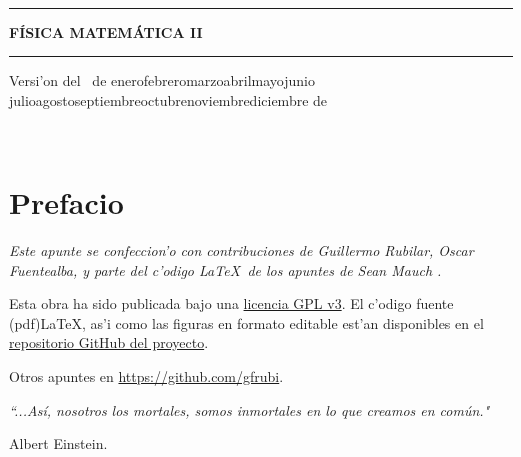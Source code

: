 \documentclass[letterpaper,11pt]{report}
\def\today{\number\day~de\space\ifcase\month\or
 enero\or febrero\or marzo\or abril\or mayo\or junio\or
 julio\or agosto\or septiembre\or octubre\or noviembre\or diciembre\fi
 \space de~\number\year}
\begin{document}
\thispagestyle{empty}
\begin{center}

\ 

\vspace{6.5cm}

\rule{15cm}{0.1cm}

\vspace{1.5cm}

{\huge \textsc{\textbf{F\'ISICA MATEM\'ATICA II}}}

\vspace{1.5cm}

\rule{15cm}{0.1cm}

\vspace{1.5cm}

Versi'on del \today

\end{center}


\newpage
\thispagestyle{empty}
\ \\
\newpage
\setcounter{page}{1}

\pagestyle{plain}
\chapter*{Prefacio}
\bigskip
\bigskip
\bigskip
\bigskip
\bigskip
\bigskip



\bigskip\emph{Este apunte se confeccion'o con contribuciones de Guillermo Rubilar, Oscar Fuentealba, y parte del c'odigo \LaTeX\, de los apuntes de Sean Mauch \cite{Mauch}.} 

\bigskip
\bigskip
\bigskip
\bigskip
\bigskip



Esta obra ha sido publicada bajo una \href{https://github.com/gfrubi/FM2/blob/master/LICENSE}{licencia GPL v3}. El c'odigo fuente (pdf)\LaTeX, as'i como las figuras en formato editable est'an disponibles en el \href{https://github.com/gfrubi/FM2}{repositorio GitHub del proyecto}.

\bigskip
\bigskip
\bigskip
\bigskip
\bigskip
\bigskip

Otros apuntes en \url{https://github.com/gfrubi}.

\bigskip
\bigskip
\bigskip
\bigskip
\bigskip
\bigskip





\emph{\textquotedblleft ...As\'i, nosotros los mortales, somos
inmortales en lo que creamos en com\'un."}

\begin{flushright}
Albert Einstein.
\end{flushright}
\newpage

\tableofcontents
{}
\setcounter{page}{1}








\appendix





\end{document}
